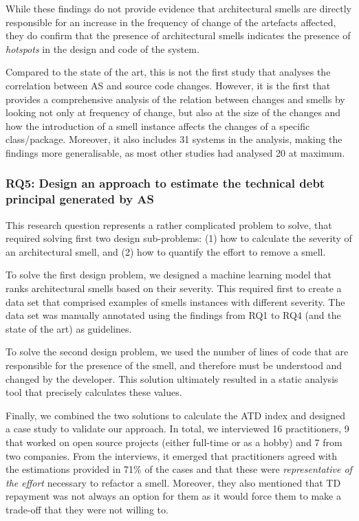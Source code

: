 While these findings do not provide evidence that architectural smells are directly responsible for an increase in the frequency of change of the artefacts affected, they do confirm that the presence of architectural smells indicates the presence of \emph{hotspots} in the design and code of the system.

Compared to the state of the art, this is not the first study that analyses the correlation between AS and source code changes. However, it is the first that provides a comprehensive analysis of the relation between changes and smells by looking not only at frequency of change, but also at the size of the changes and how the introduction of a smell instance affects the changes of a specific class/package.
Moreover, it also includes 31 systems in the analysis, making the findings more generalisable, as most other studies had analysed 20 at maximum.

\subsubsection*{RQ5: Design an approach to estimate the technical debt principal generated by AS}
This research question represents a rather complicated problem to solve, that required solving first two design sub-problems: (1) how to calculate the severity of an architectural smell, and (2) how to quantify the effort to remove a smell.

To solve the first design problem, we designed a machine learning model that ranks architectural smells based on their severity. 
This required first to create a data set that comprised examples of smells instances with different severity. The data set was manually annotated using the findings from RQ1 to RQ4 (and the state of the art) as guidelines. 

To solve the second design problem, we used the number of lines of code that are responsible for the presence of the smell, and therefore must be understood and changed by the developer.
This solution ultimately resulted in a static analysis tool that precisely calculates these values.

Finally, we combined the two solutions to calculate the ATD index and designed a case study to validate our approach.
In total, we interviewed 16 practitioners, 9 that worked on open source projects (either full-time or as a hobby) and 7 from two companies.
From the interviews, it emerged that practitioners agreed with the estimations provided in 71\% of the cases and that these were \emph{representative of the effort} necessary to refactor a smell.
Moreover, they also mentioned that TD repayment was not always an option for them as it would force them to make a trade-off that they were not willing to.

